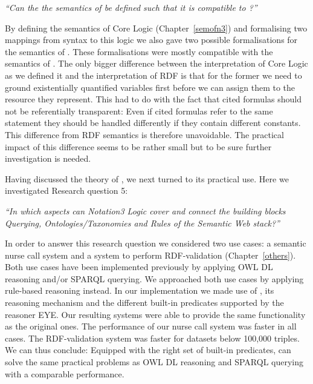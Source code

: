 \emph{``Can the the semantics of \nthreelogic be defined such that it is compatible to \rdf?''}

By defining the semantics of \nthree Core Logic (Chapter~\ref{semofn3}) and formalising two mappings from \nthree syntax to this logic we also gave two possible 
formalisations for the semantics of \nthree. These formalisations were mostly compatible with the semantics of \rdf. 
The only bigger difference between the interpretation of \nthree Core Logic as we defined it and the interpretation of RDF
is that for the former we need to ground existentially quantified variables 
first before we can assign them to the resource they represent. This had to do with the fact that cited  \nthree formulas should not be referentially transparent:
Even if cited formulas refer to the same statement they should be handled differently if they contain different constants. This difference 
from RDF semantics is therefore unavoidable. The practical impact of this difference seems to be rather small but to be sure  further investigation is needed.

Having discussed the theory of \nthree, we next turned to its practical use. Here we investigated Research question 5:

\emph{ 
``In which aspects can Notation3 Logic cover and connect the building blocks \emph{Querying}, \emph{Ontologies/Taxonomies} and \emph{Rules} 
of the Semantic Web stack?''
}

In order to answer this research question we considered two use cases: a semantic nurse call 
system and a system to perform RDF-validation (Chapter~\ref{others}). Both use cases have been implemented previously by applying OWL DL reasoning and/or SPARQL querying.
We approached both use cases by applying rule-based reasoning instead. In our implementation we made use of \nthree, its reasoning mechanism and the different built-in 
predicates supported by the reasoner EYE. 
Our resulting systems were able to provide the same functionality as the original ones.
The performance of our nurse call system was faster in all cases.  
The RDF-validation system was faster for datasets below 100,000 triples. 
We can thus conclude: Equipped with the right set of built-in predicates, \nthree can solve the same practical problems as OWL DL reasoning and SPARQL querying with a comparable performance.

